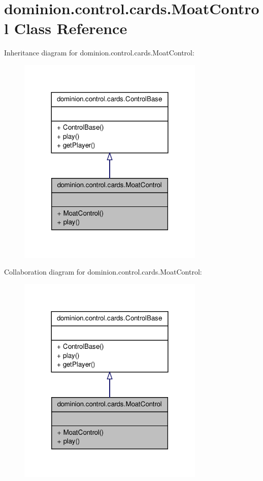 \hypertarget{classdominion_1_1control_1_1cards_1_1MoatControl}{\section{dominion.\-control.\-cards.\-Moat\-Control \-Class \-Reference}
\label{classdominion_1_1control_1_1cards_1_1MoatControl}
}


\-Inheritance diagram for dominion.\-control.\-cards.\-Moat\-Control\-:
\nopagebreak
\begin{figure}[H]
\begin{center}
\leavevmode
\includegraphics[width=252pt]{classdominion_1_1control_1_1cards_1_1MoatControl__inherit__graph}
\end{center}
\end{figure}


\-Collaboration diagram for dominion.\-control.\-cards.\-Moat\-Control\-:
\nopagebreak
\begin{figure}[H]
\begin{center}
\leavevmode
\includegraphics[width=252pt]{classdominion_1_1control_1_1cards_1_1MoatControl__coll__graph}
\end{center}
\end{figure}

